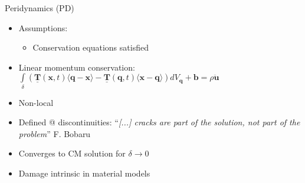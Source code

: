\begin{frame}[t]{\secname}{\subsecname}
\begin{columns}[t]
\begin{column}{0.5\textwidth}
{\begin{block}{Peridynamics (PD)}
\begin{itemize}[noitemsep]
          \item Assumptions:
          \begin{itemize}[noitemsep]
            \item Conservation equations satisfied
          \end{itemize}
          \item Linear momentum conservation:\\[1ex]
            \hspace{-2em}$\int\limits_{\delta}(\underline{\mathbf{T}}(\mathbf{x},t)\langle\mathbf{q}-\mathbf{x}\rangle-\underline{\mathbf{T}}(\mathbf{q},t)\langle\mathbf{x}-\mathbf{q}\rangle)dV_{\mathbf{q}}+\mathbf{b}  =\rho\ddot{\mathbf{u}}$
          \item Non-local
          \item Defined @ discontinuities: ``\textit{[...] cracks are part of the solution, not part of the problem}'' F. Bobaru
          \item Converges to CM solution for $\delta\rightarrow0$
          \item Damage intrinsic in material models
        \end{itemize}
      \end{block}
    }
  \end{column}
\end{columns}

\end{frame}
